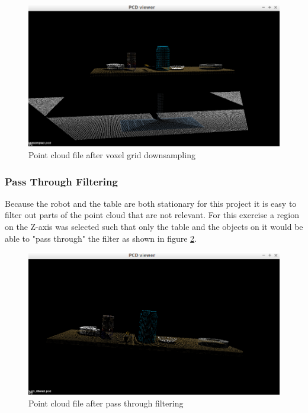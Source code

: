 \documentclass{article}
\begin{document}
\begin{figure}[H]
    \includegraphics[width=\linewidth]{ex1downsampled.png}
    \caption{Point cloud file after voxel grid downsampling}
    \label{fig:downsampled}
\end{figure}

\subsubsection{Pass Through Filtering}
Because the robot and the table are both stationary for this project it is easy to filter out parts of the point cloud that are not relevant. For this exercise a region on the Z-axis was selected such that only the table and the objects on it would be able to "pass through" the filter as shown in figure \ref{fig:passthrough}.

\begin{figure}[H]
    \includegraphics[width=\linewidth]{ex1passthrough.png}
    \caption{Point cloud file after pass through filtering}
    \label{fig:passthrough}
\end{figure}
\end{document}
